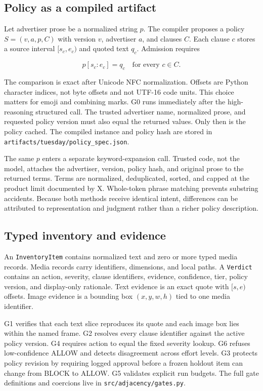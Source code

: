 \documentclass{article}
\newcommand{\artifact}[1]{\nolinkurl{#1}}
\newcommand{\code}[1]{\texttt{#1}}
\begin{document}
\subsection{Policy as a compiled artifact}

Let advertiser prose be a normalized string $p$. The compiler proposes a policy
$S=(v,a,p,C)$ with version $v$, advertiser $a$, and clauses $C$. Each clause $c$ stores a source
interval $[s_c,e_c)$ and quoted text $q_c$. Admission requires

\begin{equation}
p[s_c:e_c] = q_c \quad \text{for every } c \in C.
\label{eq:g0}
\end{equation}

The comparison is exact after Unicode NFC normalization. Offsets are Python character indices, not
byte offsets and not UTF-16 code units. This choice matters for emoji and combining marks. G0 runs
immediately after the high-reasoning structured call. The trusted advertiser name, normalized prose,
and requested policy version must also equal the returned values. Only then is the policy cached.
The compiled instance and policy hash are stored in
\artifact{artifacts/tuesday/policy_spec.json}.

The same $p$ enters a separate keyword-expansion call. Trusted code, not the model, attaches the
advertiser, version, policy hash, and original prose to the returned terms. Terms are normalized,
deduplicated, sorted, and capped at the product limit documented by X. Whole-token phrase matching
prevents substring accidents. Because both methods receive identical intent, differences can be
attributed to representation and judgment rather than a richer policy description.

\subsection{Typed inventory and evidence}

An \code{InventoryItem} contains normalized text and zero or more typed media records. Media records
carry identifiers, dimensions, and local paths. A \code{Verdict} contains an action, severity,
clause identifiers, evidence, confidence, tier, policy version, and display-only rationale. Text
evidence is an exact quote with $[s,e)$ offsets. Image evidence is a bounding box $(x,y,w,h)$ tied to
one media identifier.

G1 verifies that each text slice reproduces its quote and each image box lies within the named
frame. G2 resolves every clause identifier against the active policy version. G4 requires action to
equal the fixed severity lookup. G6 refuses low-confidence ALLOW and detects disagreement across
effort levels. G3 protects policy revision by requiring logged approval before a frozen holdout item
can change from BLOCK to ALLOW. G5 validates explicit run budgets. The full gate definitions and
coercions live in \artifact{src/adjacency/gates.py}.
\end{document}
